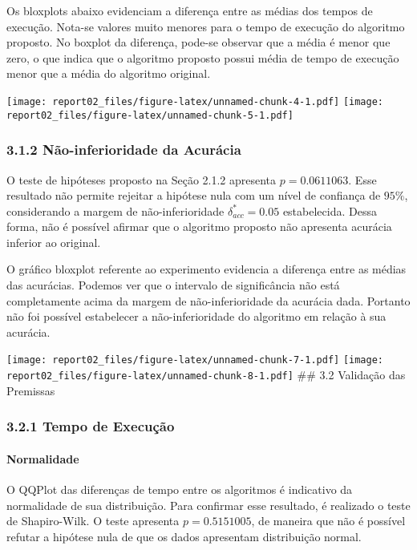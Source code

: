 \documentclass[]{article}
\let\oldparagraph\paragraph
\renewcommand{\paragraph}[1]{\oldparagraph{#1}\mbox{}}
\begin{document}
Os bloxplots abaixo evidenciam a diferença entre as médias dos tempos de
execução. Nota-se valores muito menores para o tempo de execução do
algoritmo proposto. No boxplot da diferença, pode-se observar que a
média é menor que zero, o que indica que o algoritmo proposto possui
média de tempo de execução menor que a média do algoritmo original.

\texttt{[image: report02\_files/figure-latex/unnamed-chunk-4-1.pdf]}
\texttt{[image: report02\_files/figure-latex/unnamed-chunk-5-1.pdf]}

\subsubsection{3.1.2 Não-inferioridade da
Acurácia}\label{nao-inferioridade-da-acuracia-1}

O teste de hipóteses proposto na Seção 2.1.2 apresenta
\(p = 0.0611063\). Esse resultado não permite rejeitar a hipótese nula
com um nível de confiança de \(95\%\), considerando a margem de
não-inferioridade \(\delta_{acc}^{*} = 0.05\) estabelecida. Dessa forma,
não é possível afirmar que o algoritmo proposto não apresenta acurácia
inferior ao original.

O gráfico bloxplot referente ao experimento evidencia a diferença entre
as médias das acurácias. Podemos ver que o intervalo de significância
não está completamente acima da margem de não-inferioridade da acurácia
dada. Portanto não foi possível estabelecer a não-inferioridade do
algoritmo em relação à sua acurácia.

\texttt{[image: report02\_files/figure-latex/unnamed-chunk-7-1.pdf]}
\texttt{[image: report02\_files/figure-latex/unnamed-chunk-8-1.pdf]} \#\#
3.2 Validação das Premissas

\subsubsection{3.2.1 Tempo de Execução}\label{tempo-de-execucao}

\paragraph{Normalidade}\label{normalidade}

O QQPlot das diferenças de tempo entre os algoritmos é indicativo da
normalidade de sua distribuição. Para confirmar esse resultado, é
realizado o teste de Shapiro-Wilk. O teste apresenta \(p = 0.5151005\),
de maneira que não é possível refutar a hipótese nula de que os dados
apresentam distribuição normal.
\end{document}
